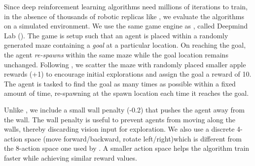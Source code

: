 Since deep reinforcement learning algorithms need millions of iterations to train, in the absence of thousands of robotic replicas like \cite{LePaKrISER2017}, we evaluate the algorithms on a simulated environment.
We use the same game engine as \cite{MiPaViICLR2017}, called Deepmind Lab (\cite{BeLeTeARXIV2016}).
The game is setup such that an agent is placed within a randomly generated maze containing a \emph{goal} at a particular location.
On reaching the goal, the agent \emph{re-spawns} within the same maze while the goal location remains unchanged. 
Following \cite{MiPaViICLR2017}, we scatter the maze with randomly placed smaller apple rewards (+1) to encourage initial explorations and assign the goal a reward of 10.
The agent is tasked to find the goal as many times as possible within a fixed amount of time, re-spawning at the spawn location each time it reaches the goal.

Unlike \cite{MiPaViICLR2017}, we include a small wall penalty (-0.2) that pushes the agent away from the wall.
The wall penalty is useful to prevent agents from moving along the walls, thereby discarding vision input for exploration.
We also use a discrete 4-action space (move forward/backward, rotate left/right)which is different from the 8-action space one used by \cite{MiPaViICLR2017}.
A smaller action space helps the algorithm train faster while achieving similar reward values.

